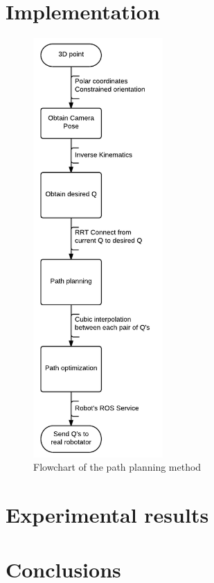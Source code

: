 \section{Implementation} %
\label{sec:implementation}
\begin{figure}[!ht]
	\centering
	\includegraphics[height=16cm]{figures/path_planning_flowchart}
	\caption{Flowchart of the path planning method}
	\label{fig:path_planning_flowchart}
\end{figure}

\section{Experimental results} %
\label{sec:experimental_results}


\section{Conclusions} %
\label{sec:conclusions}


